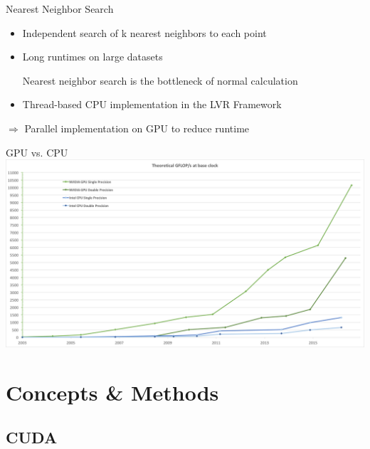 \documentclass{beamer}
\begin{document}
\begin{frame}{Nearest Neighbor Search}
	\begin{itemize}
		\item Independent search of k nearest neighbors to each point
		\item Long runtimes on large datasets
		\begin{block}{}
			\centering Nearest neighbor search is the bottleneck of normal calculation
		\end{block}
		\item Thread-based CPU implementation in the LVR Framework
	\end{itemize}
	\medskip
	\centering $\Rightarrow$ Parallel implementation on GPU to reduce runtime
\end{frame}

\begin{frame}{GPU vs. CPU}
	\includegraphics[width=1.0\textwidth]{gpu_comparison.png}
\end{frame}

\section{Concepts \& Methods}

\subsection*{CUDA}
\end{document}
